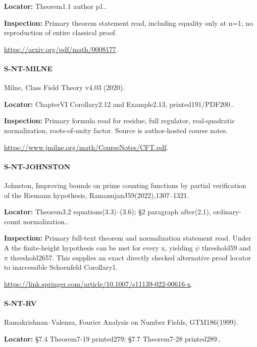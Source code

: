 \documentclass[11pt,a4paper]{article}
\begin{document}
\textbf{Locator:} Theorem1.\allowbreak{}1 author p1.\allowbreak{}.

\textbf{Inspection:} Primary theorem statement read, including equality only at n=1; no reproduction of entire classical proof.\allowbreak{}

\url{https://arxiv.org/pdf/math/0008177}.

\paragraph{S-NT-MILNE} Milne, Class Field Theory v4.\allowbreak{}03 (2020).

\textbf{Locator:} ChapterVI Corollary2.\allowbreak{}12 and Example2.\allowbreak{}13, printed191/\allowbreak{}PDF200.\allowbreak{}.

\textbf{Inspection:} Primary formula read for residue, full regulator, real-quadratic normalization, roots-of-unity factor.\allowbreak{} Source is author-hosted course notes.\allowbreak{}

\url{https://www.jmilne.org/math/CourseNotes/CFT.pdf}.

\paragraph{S-NT-JOHNSTON} Johnston, Improving bounds on prime counting functions by partial verification of the Riemann hypothesis, RamanujanJ59(2022),1307–\allowbreak{}1321.

\textbf{Locator:} Theorem3.\allowbreak{}2 equations(3.\allowbreak{}3)–\allowbreak{}(3.\allowbreak{}6); §2 paragraph after(2.\allowbreak{}1), ordinary-count normalization.\allowbreak{}.

\textbf{Inspection:} Primary full-text theorem and normalization statement read.\allowbreak{} Under A the finite-height hypothesis can be met for every x, yielding \ensuremath{\psi} threshold59 and \ensuremath{\pi} threshold2657.\allowbreak{} This supplies an exact directly checked alternative proof locator to inaccessible Schoenfeld Corollary1.\allowbreak{}

\url{https://link.springer.com/article/10.1007/s11139-022-00616-x}.

\paragraph{S-NT-RV} Ramakrishnan–\allowbreak{}Valenza, Fourier Analysis on Number Fields, GTM186(1999).

\textbf{Locator:} §7.\allowbreak{}4 Theorem7-19 printed279; §7.\allowbreak{}7 Theorem7-28 printed289.\allowbreak{}.
\end{document}
